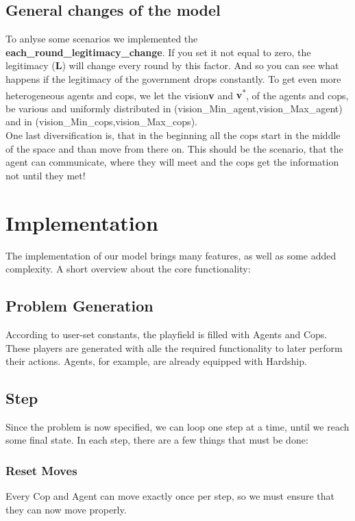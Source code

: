 \documentclass[11pt]{article}
\begin{document}
\subsection{General changes of the model}
To anlyse some scenarios we implemented  the \textbf{each\_round\_legitimacy\_change}. If you set it not equal to zero, the legitimacy (\textbf{L}) will change every round by this factor. And so you can see what happens if the legitimacy of the government drops constantly.
To get even more heterogeneous agents and cops, we let the vision\textbf{v} and \textbf{v\textsuperscript{$\ast$}}, of the agents and cops, be various and uniformly distributed in (vision\_Min\_agent,vision\_Max\_agent) and in (vision\_Min\_cops,vision\_Max\_cops).\\
One last diversification is, that in the beginning all the cops start in the middle of the space and than move from there on. This should be the scenario, that the agent can communicate, where they will meet and the cops get the information not until they met!

\newpage

\section{Implementation}

The implementation of our model brings many features, as well as some added complexity.\newline
A short overview about the core functionality:\newline

\subsection{Problem Generation}
According to user-set constants, the playfield is filled with Agents and Cops. These players are generated with alle the required functionality to later perform their actions. Agents, for example, are already equipped with Hardship.
\subsection{Step}
Since the problem is now specified, we can loop one step at a time, until we reach some final state. In each step, there are a few things that must be done:
\subsubsection{Reset Moves}
Every Cop and Agent can move exactly once per step, so we must ensure that they can now move properly.
\end{document}
